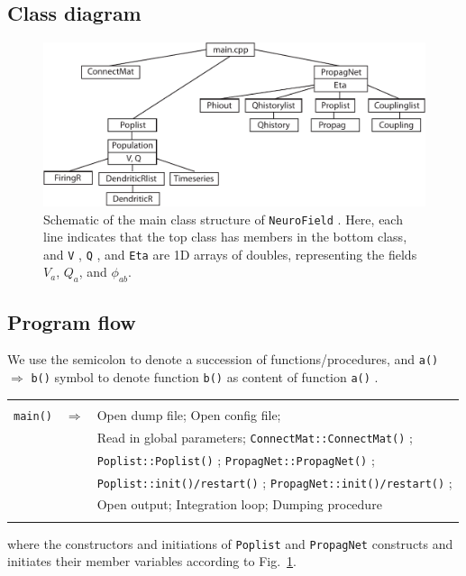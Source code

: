 \documentclass[12pt,a4paper]{article}
\newcommand{\type}[1]{ {\small\small\tt #1} }
\begin{document}
\subsection{Class diagram}

\begin{figure}[h!]\begin{center}\includegraphics[scale=.8]{class.pdf}\caption{Schematic of the main class structure of \type{NeuroField}. Here, each line indicates that the top class has members in the bottom class, and \type{V}, \type{Q}, and \type{Eta} are 1D arrays of doubles, representing the fields $V_a$, $Q_a$, and $\phi_{ab}$.}\label{fig:class}\end{center}\end{figure}

\subsection{Program flow}

We use the semicolon to denote a succession of functions/procedures, and \type{a()} $\Rightarrow$ \type{b()} symbol to denote function \type{b()} as content of function \type{a()}.

\begin{center}
\begin{tabular}{ | l l p{12cm} | }
\hline \\

\type{main()}& $\Rightarrow$ &Open dump file; Open config file;\\[6pt]
&&Read in global parameters;\type{ConnectMat::ConnectMat()};\\[6pt]
&&\type{Poplist::Poplist()}; \type{PropagNet::PropagNet()};\\[6pt]
&&\type{Poplist::init()/restart()}; \type{PropagNet::init()/restart()};\\[6pt]
&&Open output; Integration loop; Dumping procedure \\[6pt]

\\\hline
\end{tabular}
\end{center}
where the constructors and initiations of \type{Poplist} and \type{PropagNet} constructs and initiates their member variables according to Fig.~\ref{fig:class}.
\end{document}
